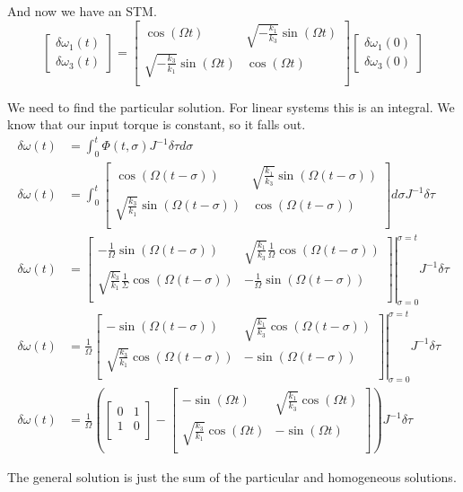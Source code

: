 \documentclass[]{article}
\begin{document}
And now we have an STM.
\begin{equation}
	\begin{bmatrix}
	\delta \omega_1 (t) \\
	\delta \omega_3 (t)
	\end{bmatrix} = \begin{bmatrix}
	\cos(\Omega t) & \sqrt{-\frac{k_1}{k_3}} \sin(\Omega t) \\
	\sqrt{-\frac{k_3}{k_1}} \sin(\Omega t) & \cos(\Omega t) \\
	\end{bmatrix} \begin{bmatrix}
	\delta \omega_1 (0) \\
	\delta \omega_3 (0)
	\end{bmatrix}
\end{equation}

We need to find the particular solution. For linear systems this is an integral. We know that our input torque is constant, so it falls out.
\begin{align}
	\delta \omega (t) & = \int_{0}^{t} \Phi(t,\sigma) J^{-1} \delta \tau d \sigma \\
	\delta \omega (t) & = \int_{0}^{t} \begin{bmatrix}
	\cos(\Omega (t - \sigma)) & \sqrt{\frac{k_1}{k_3}} \sin(\Omega (t - \sigma)) \\
	\sqrt{\frac{k_3}{k_1}} \sin(\Omega (t - \sigma)) & \cos(\Omega (t - \sigma)) \\
	\end{bmatrix} d \sigma J^{-1} \delta \tau \\
	\delta \omega (t) & = \left. \begin{bmatrix}
	-\frac{1}{\Omega}\sin(\Omega (t - \sigma)) & \sqrt{\frac{k_1}{k_3}} \frac{1}{\Omega} \cos(\Omega (t - \sigma)) \\
	\sqrt{\frac{k_3}{k_1}} \frac{1}{\Sigma} \cos(\Omega (t - \sigma)) & -\frac{1}{\Omega} \sin(\Omega (t - \sigma)) \\
	\end{bmatrix} \right|_{\sigma = 0}^{\sigma = t} J^{-1} \delta \tau \\
	\delta \omega (t) & = \frac{1}{\Omega} \left. \begin{bmatrix}
	-\sin(\Omega (t - \sigma)) & \sqrt{\frac{k_1}{k_3}} \cos(\Omega (t - \sigma)) \\
	\sqrt{\frac{k_3}{k_1}} \cos(\Omega (t - \sigma)) & - \sin(\Omega (t - \sigma)) \\
	\end{bmatrix} \right|_{\sigma = 0}^{\sigma = t} J^{-1} \delta \tau \\
	\delta \omega (t) & = \frac{1}{\Omega} \left( \begin{bmatrix}
	0 & 1 \\
	1 & 0 \\
	\end{bmatrix} - \begin{bmatrix}
	-\sin(\Omega t) & \sqrt{\frac{k_1}{k_3}} \cos(\Omega t) \\
	\sqrt{\frac{k_3}{k_1}} \cos(\Omega t) & - \sin(\Omega t) \\
	\end{bmatrix} \right) J^{-1} \delta \tau
\end{align}

The general solution is just the sum of the particular and homogeneous solutions.
\end{document}
